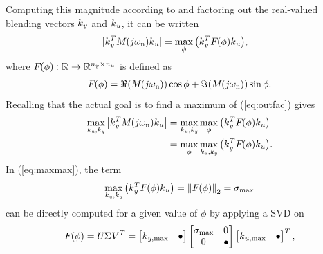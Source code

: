 \documentclass[aerospace,article,submit,moreauthors,pdftex,10pt,a4paper]{Definitions/mdpi}
\begin{document}
Computing this magnitude according to \cite{Pusch18a} and factoring out the real-valued blending vectors $\aevec{k}{y}$ and $\aevec{k}{u}$, it can be written
%
\begin{align}
\label{eq:outfac}
\begin{split}
|\aevec{k}{y}^T \aemat{M}{}(j\omega_{\text{n}}) \aevec{k}{u}|
&=
\max_{\phi} 
\big(
\aevec{k}{y}^T  \aemat{F}{}(\phi) \aevec{k}{u} 
\big),
\end{split}
\end{align}
%
where $\aemat{F}{}(\phi) : \mathbb{R} \rightarrow \mathbb{R}^{n_y \times n_u}$ is defined as
%
\begin{align}
\label{eq:F}
\aemat{F}{}(\phi)=
\Re{(\aemat{M}{}(j\omega_{\text{n}}))} \cos \phi + 
\Im{(\aemat{M}{}(j\omega_{\text{n}}))} \sin \phi .
\end{align}
%
Recalling that the actual goal is to find a maximum of (\ref{eq:outfac}) gives
%
\begin{align}
\begin{split}
\label{eq:maxmax}
\max_{\aevec{k}{u},\aevec{k}{y}} 
\left|  \aevec{k}{y}^T \aemat{M}{}(j\omega_{\text{n}}) \aevec{k}{u} \right|
&=
\max_{\aevec{k}{u},\aevec{k}{y}} \max_{\phi}
\big( 
\aevec{k}{y}^T  \aemat{F}{}(\phi) \aevec{k}{u} 
\big)
\\
&=
\max_{\phi} \max_{\aevec{k}{u},\aevec{k}{y}} 
\big( 
\aevec{k}{y}^T  \aemat{F}{}(\phi) \aevec{k}{u} 
\big).
\end{split}
\end{align}
% 
In (\ref{eq:maxmax}), the term
%
\begin{align}
\label{eq:sigmaMax}
\max_{\aevec{k}{u},\aevec{k}{y}} 
\left( 
\aevec{k}{y}^T  \aemat{F}{}(\phi) \aevec{k}{u} 
\right)
=
\norm{\aemat{F}{}(\phi)}{2}
=
\sigma_{\text{max}}
\end{align}
%
can be directly computed for a given value of $\phi$ by applying a \ac{SVD} on
%
\begin{align}
\label{eq:svd}
\aemat{F}{}(\phi)
=
\aemat{U}{} \aemat{\Sigma}{} \aemat{V}{}^T
=
\begin{bmatrix}
\aevec{k}{y,\text{max}} & \bullet 
\end{bmatrix}
\begin{bmatrix} 
\aesym{\sigma}{\text{max}} & \aemat{0}{} \\ \aemat{0}{} & \bullet 
\end{bmatrix}
\begin{bmatrix}
\aemat{k}{u,\text{max}} & \bullet
\end{bmatrix}^T,
\end{align}
\end{document}
